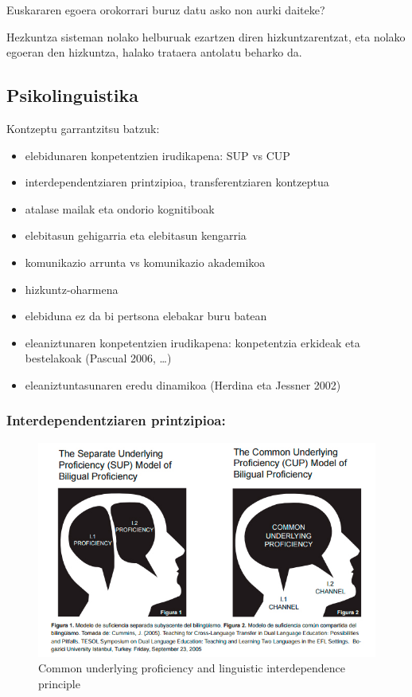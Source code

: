 \documentclass[
]{book}
\providecommand{\tightlist}{%
  \setlength{\itemsep}{0pt}\setlength{\parskip}{0pt}}
\begin{document}
Euskararen egoera orokorrari buruz datu asko non aurki daiteke?

Hezkuntza sisteman nolako helburuak ezartzen diren hizkuntzarentzat, eta nolako egoeran den hizkuntza, halako trataera antolatu beharko da.

\hypertarget{psikolinguistika}{%
\subsection{Psikolinguistika}\label{psikolinguistika}}

Kontzeptu garrantzitsu batzuk:

\begin{itemize}
\tightlist
\item
  elebidunaren konpetentzien irudikapena: SUP vs CUP
\item
  interdependentziaren printzipioa, transferentziaren kontzeptua\\
\item
  atalase mailak eta ondorio kognitiboak
\item
  elebitasun gehigarria eta elebitasun kengarria
\item
  komunikazio arrunta vs komunikazio akademikoa
\item
  hizkuntz-oharmena
\item
  elebiduna ez da bi pertsona elebakar buru batean
\item
  eleaniztunaren konpetentzien irudikapena: konpetentzia erkideak eta bestelakoak (Pascual 2006, \ldots)
\item
  eleaniztuntasunaren eredu dinamikoa (Herdina eta Jessner 2002)
\end{itemize}

\hypertarget{interdependentziaren-printzipioa}{%
\subsubsection{Interdependentziaren printzipioa:}\label{interdependentziaren-printzipioa}}

\begin{figure}
\centering
\includegraphics{assets/2-image2.png}
\caption{Common underlying proficiency and linguistic interdependence principle}
\end{figure}
\end{document}
